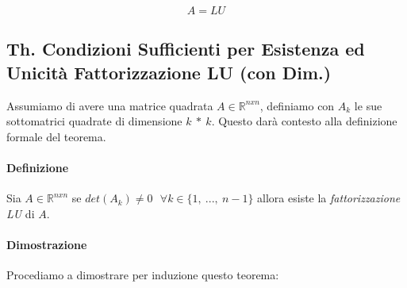 \documentclass{article}
\begin{document}
\[ \boxed{A = LU} \]

\subsection{Th. Condizioni Sufficienti per Esistenza ed Unicità Fattorizzazione LU (con Dim.)}

Assumiamo di avere una matrice quadrata $A \in \mathbb{R}^{nxn}$, definiamo con $A_{k}$ le sue sottomatrici quadrate di dimensione $k \: * \: k$. Questo darà contesto alla definizione formale del teorema.

\paragraph{Definizione} Sia $A \in \mathbb{R}^{nxn}$ se $det(A_{k}) \neq 0 \: \: \: \forall k \in \{ 1,\:...,\:n-1 \}$ allora esiste la \textit{fattorizzazione LU} di $A$.

\paragraph{Dimostrazione}

Procediamo a dimostrare per induzione questo teorema:
\end{document}
